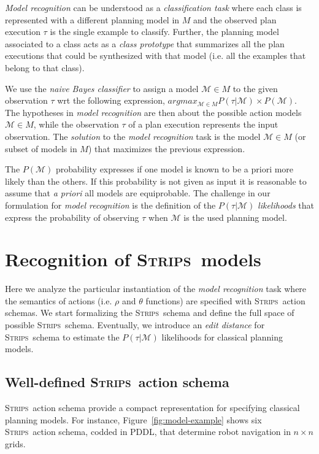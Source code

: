 \documentclass[letterpaper]{article} %
\newcommand{\strips}{\textsc{Strips}}     %
\begin{document}
{\em Model recognition} can be understood as a {\em classification task} where each class is represented with a different planning model in $M$ and the observed plan execution $\tau$ is the single example to classify. Further, the planning model associated to a class acts as a {\em class prototype} that summarizes all the plan executions that could be synthesized with that model (i.e. all the examples that belong to that class).

We use the {\em naive Bayes classifier} to assign a model $\mathcal{M}\in M$ to the given observation $\tau$ wrt the following expression, $argmax_{\mathcal{M}\in M} P(\tau|\mathcal{M})\times P(\mathcal{M})$. The hypotheses in {\em model recognition} are then about the possible action models $\mathcal{M}\in M$, while the observation $\tau$ of a plan execution represents the input observation. The {\em solution} to the {\em model recognition} task is the model $\mathcal{M}\in M$ (or subset of models in $M$) that maximizes the previous expression.

The $P(\mathcal{M})$ probability expresses if one model is known to be a priori more likely than the others. If this probability is not given as input it is reasonable to assume that {\em a priori} all models are equiprobable. The challenge in our formulation for {\em model recognition} is the definition of the $P(\tau|\mathcal{M})$ {\em likelihoods} that express the probability of observing $\tau$ when $\mathcal{M}$ is the used planning model.



\section{Recognition of \strips\ models}
\label{sec:asPlanning}
Here we analyze the particular instantiation of the {\em model recognition} task where the semantics of actions (i.e. $\rho$ and $\theta$ functions) are specified with \strips\ action schemas. We start formalizing the \strips\ schema and define the full space of possible \strips\ schema. Eventually, we introduce an {\em edit distance} for \strips\ schema to estimate the $P(\tau|\mathcal{M})$ likelihoods for classical planning models.

\subsection{Well-defined \strips\ action schema}
\strips\ action schema provide a compact representation for specifying classical planning models. For instance, Figure~\ref{fig:model-example} shows six \strips\ action schema, codded in PDDL, that determine robot navigation in $n\times n$ grids.
\end{document}
